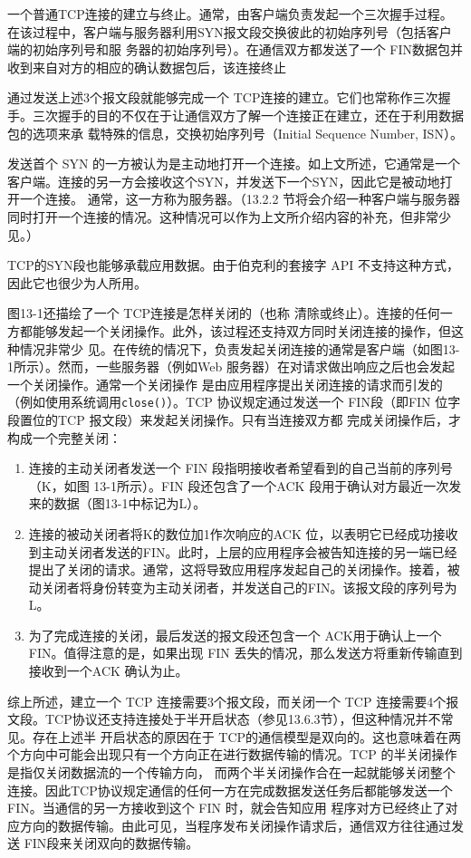 一个普通TCP连接的建立与终止。通常，由客户端负责发起一个三次握手过程。在该过程中，客户端与服务器利用SYN报文段交换彼此的初始序列号（包括客户端的初始序列号和服
务器的初始序列号）。在通信双方都发送了一个 FIN数据包并收到来自对方的相应的确认数据包后，该连接终止

通过发送上述3个报文段就能够完成一个 TCP连接的建立。它们也常称作三次握手。三次握手的目的不仅在于让通信双方了解一个连接正在建立，还在于利用数据包的选项来承
载特殊的信息，交换初始序列号（Initial Sequence Number, ISN）。

发送首个 SYN
的一方被认为是主动地打开一个连接。如上文所述，它通常是一个客户端。连接的另一方会接收这个SYN，并发送下一个SYN，因此它是被动地打开一个连接。
通常，这一方称为服务器。（13.2.2 节将会介绍一种客户端与服务器同时打开一个连接的情况。这种情况可以作为上文所介绍内容的补充，但非常少见。）

\begin{tcolorbox}[title = {注意}]
  TCP的SYN段也能够承载应用数据。由于伯克利的套接字 API 不支持这种方式，因此它也很少为人所用。
\end{tcolorbox}

图13-1还描绘了一个 TCP连接是怎样关闭的（也称
清除或终止）。连接的任何一方都能够发起一个关闭操作。此外，该过程还支持双方同时关闭连接的操作，但这种情况非常少
见。在传统的情况下，负责发起关闭连接的通常是客户端（如图13-1所示）。然而，一些服务器（例如Web
服务器）在对请求做出响应之后也会发起一个关闭操作。通常一个关闭操作
是由应用程序提出关闭连接的请求而引发的（例如使用系统调用\verb|close()|）。TCP 协议规定通过发送一个 FIN段（即FIN
位字段置位的TCP 报文段）来发起关闭操作。只有当连接双方都
完成关闭操作后，才构成一个完整关闭：
\begin{enumerate}
  \item 连接的主动关闭者发送一个 FIN 段指明接收者希望看到的自己当前的序列号（K，如图 13-1所示）。FIN
    段还包含了一个ACK 段用于确认对方最近一次发来的数据（图13-1中标记为L）。
  \item 连接的被动关闭者将K的数位加1作次响应的ACK
    位，以表明它已经成功接收到主动关闭者发送的FIN。此时，上层的应用程序会被告知连接的另一端已经提出了关闭的请求。通常，这将导致应用程序发起自己的关闭操作。接着，被动关闭者将身份转变为主动关闭者，并发送自己的FIN。该报文段的序列号为L。
  \item 为了完成连接的关闭，最后发送的报文段还包含一个 ACK用于确认上一个FIN。值得注意的是，如果出现 FIN
    丢失的情况，那么发送方将重新传输直到接收到一个ACK 确认为止。
\end{enumerate}

综上所述，建立一个 TCP 连接需要3个报文段，而关闭一个 TCP
连接需要4个报文段。TCP协议还支持连接处于半开启状态（参见13.6.3节），但这种情况并不常见。存在上述半
开启状态的原因在于 TCP的通信模型是双向的。这也意味着在两个方向中可能会出现只有一个方向正在进行数据传输的情况。TCP
的半关闭操作是指仅关闭数据流的一个传输方向，
而两个半关闭操作合在一起就能够关闭整个连接。因此TCP协议规定通信的任何一方在完成数据发送任务后都能够发送一个
FIN。当通信的另一方接收到这个 FIN 时，就会告知应用
程序对方已经终止了对应方向的数据传输。由此可见，当程序发布关闭操作请求后，通信双方往往通过发送 FIN段来关闭双向的数据传输。

